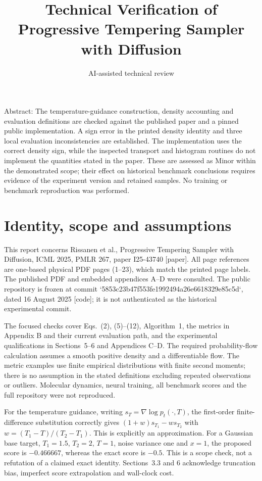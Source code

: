 \documentclass[10pt]{article}
\title{Technical Verification of
Progressive Tempering Sampler with Diffusion}
\author{AI-assisted technical review}
\date{}
\begin{document}
\maketitle
Abstract: The temperature-guidance construction, density accounting and evaluation definitions are checked against the published paper and a pinned public implementation. A sign error in the printed density identity and three local evaluation inconsistencies are established. The implementation uses the correct density sign, while the inspected transport and histogram routines do not implement the quantities stated in the paper. These are assessed as Minor within the demonstrated scope; their effect on historical benchmark conclusions requires evidence of the experiment version and retained samples. No training or benchmark reproduction was performed.\par
\section*{Identity, scope and assumptions}
This report concerns Rissanen et al., Progressive Tempering Sampler with Diffusion, ICML 2025, PMLR 267, paper I25-43740 [paper]. All page references are one-based physical PDF pages (1–23), which match the printed page labels. The published PDF and embedded appendices A–D were consulted. The public repository is frozen at commit `5853c23b47f553fe1992494a26e6618329e85c5d`, dated 16 August 2025 [code]; it is not authenticated as the historical experimental commit.\par
The focused checks cover Eqs. (2), (5)–(12), Algorithm 1, the metrics in Appendix B and their current evaluation path, and the experimental qualifications in Sections 5–6 and Appendices C–D. The required probability-flow calculation assumes a smooth positive density and a differentiable flow. The metric examples use finite empirical distributions with finite second moments; there is no assumption in the stated definitions excluding repeated observations or outliers. Molecular dynamics, neural training, all benchmark scores and the full repository were not reproduced.\par
For the temperature guidance, writing \(s_T=\nabla\log p_t(\cdot,T)\), the first-order finite-difference substitution correctly gives \((1+w)s_{T_1}-ws_{T_2}\) with \(w=(T_1-T)/(T_2-T_1)\). This is explicitly an approximation. For a Gaussian base target, \(T_1=1.5\), \(T_2=2\), \(T=1\), noise variance one and \(x=1\), the proposed score is \(-0.466667\), whereas the exact score is \(-0.5\). This is a scope check, not a refutation of a claimed exact identity. Sections 3.3 and 6 acknowledge truncation bias, imperfect score extrapolation and wall-clock cost.\par
\end{document}
